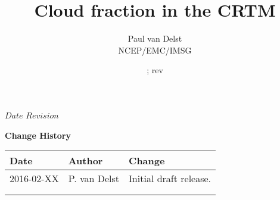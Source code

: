 


\newcommand{\lineacrosspage}{\noindent\rule[0.5ex]{\linewidth}{1pt}}



\SVN $Date$
\SVN $Revision$

\title{Cloud fraction in the CRTM}
\author{Paul van Delst\\NCEP/EMC/IMSG}
\date{\SVNDate ; rev\SVNRevision}



\maketitle

\draftwatermark



\thispagestyle{empty}
\vspace*{10cm}
\begin{center}
  {\sffamily\Large\bfseries Change History}
  \begin{table}[htp]
    \centering
    \begin{tabular}{|p{2cm}|p{3cm}|p{8cm}|}
      \hline
      \sffamily\textbf{Date} & \sffamily\textbf{Author} & \sffamily\textbf{Change}\\
      \hline\hline
      2016-02-XX & P. van Delst & Initial draft release.\\
      \hline
       &  &  \\
       &  &  \\
      \hline
      \hline
    \end{tabular}
  \end{table}
\end{center}
\clearpage

\pagestyle{fancy}
\fancyhead[LE,RO]{\sffamily \rightmark}
\fancyhead[LO,RE]{\sffamily \leftmark}

